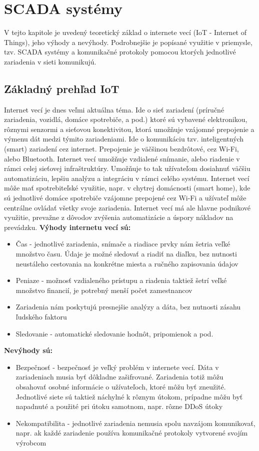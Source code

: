 \chapter{SCADA systémy}
\label{scada}
\tab V tejto kapitole je uvedený teoretický základ o internete vecí (IoT - Internet of Things), jeho výhody a nevýhody. Podrobnejšie je popísané využitie v priemysle, tzv. SCADA systémy a komunikačné protokoly pomocou ktorých jednotlivé zariadenia v sieti komunikujú.
\section{Základný prehľad IoT}
\tab Internet vecí je dnes veľmi aktuálna téma. Ide o sieť zariadení (príručné zariadenia, vozidlá, domáce spotrebiče, a pod.) ktoré sú vybavené elektronikou, rôznymi senzormi a sieťovou konektivitou, ktorá umožňuje vzájomné prepojenie a výmenu dát medzi týmito zariadeniami. Ide o komunikáciu tzv. inteligentných (smart) zariadení cez internet. Prepojenie je väčšinou bezdrôtové, cez Wi-Fi, alebo Bluetooth. Internet vecí umožňuje vzdialené snímanie, alebo riadenie v rámci celej sieťovej infraštruktúry. Umožňuje to tak užívateľom dosiahnuť väčšiu automatizáciu, lepšiu analýzu a integráciu v rámci celého systému. Internet vecí môže mať spotrebiteľské využitie, napr. v chytrej domácnosti (smart home), kde sú jednotlivé domáce spotrebiče vzájomne prepojené cez Wi-Fi a užívateľ môže centrálne ovládať všetky svoje zariadenia. Internet vecí má ale hlavne podnikové využitie, prevažne z dôvodov zvýšenia automatizácie a úspory nákladov na prevádzku\cite{IoTFundamentals}. \newline\newline
\textbf{Výhody internetu vecí sú:}
\begin{itemize}
\item Čas - jednotlivé zariadenia, snímače a riadiace prvky nám šetria veľké množstvo času. Údaje je možné sledovať a riadiť na diaľku, bez nutnosti neustáleho cestovania na konkrétne miesta a ručného zapisovania údajov
\item Peniaze - možnosť vzdialeného prístupu a riadenia taktiež šetrí veľké množstvo financií, je potrebný menší počet zamestnancov
\item Zariadenia nám poskytujú presnejšie analýzy a dáta, bez nutnosti zásahu ľudského faktoru
\item Sledovanie - automatické sledovanie hodnôt, pripomienok a pod.
\end{itemize}
\textbf{Nevýhody sú:}
\begin{itemize}
\item Bezpečnosť - bezpečnosť je veľký problém v internete vecí. Dáta v zariadeniach musia byť dôkladne zašifrované. Zariadenia totiž môžu obsahovať osobné informácie o užívateľoch, ktoré môžu byť zneužité. Jednotlivé siete sú taktiež náchylné k rôznym útokom, prípadne môžu byť napadnuté a použité pri útoku samotnom, napr. rôzne DDoS útoky
\item Nekompatibilita - jednotlivé zariadenia nemusia spolu navzájom komunikovať, napr. ak každé zariadenie používa komunikačné protokoly vytvorené svojím výrobcom\cite{IoTFundamentals}
\end{itemize}
